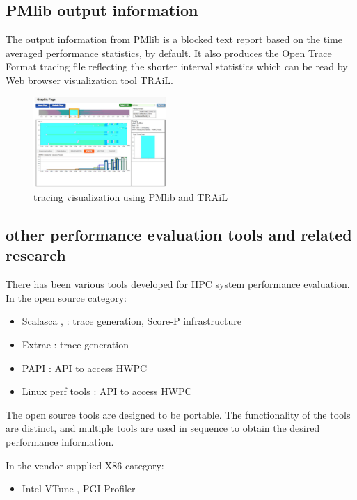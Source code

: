 \documentclass[conference]{IEEEtran}
\begin{document}
\subsection{PMlib output information}
\label{subsection:PMlib-output-information}

The output information from PMlib is a blocked text report based on
the time averaged performance statistics, by default.
It also produces the Open Trace Format tracing file reflecting
the shorter interval statistics which can be read by Web browser
visualization tool TRAiL.
\begin{figure}[tb]
\centering
\includegraphics[width=0.45\textwidth]{figs/TRAiL-small.pdf}
\caption{tracing visualization using PMlib and TRAiL}
\label{fig:TRAiL}
\end{figure}

\subsection{other performance evaluation tools and related research}
\label{subsection:related-research}
There has been various tools developed for HPC system  performance evaluation.
In the open source category:
\begin{itemize}
	\item Scalasca \cite{Scalasca:2017},\cite{Scalasca:2010}
			: trace generation, Score-P infrastructure
	\item Extrae \cite{Extrae:webpage} :  trace generation
	\item PAPI \cite{PAPI:5.6} : API to access HWPC
	\item Linux perf tools : API to access HWPC
\end{itemize}
The open source tools are designed to be portable. The functionality of the
tools are distinct, and multiple tools are used in sequence to obtain
the desired performance information.

In the vendor supplied X86 category:
\begin{itemize}
		\item Intel VTune \cite{Intel:VTune}, PGI Profiler \cite{PGI:Profiler}
\end{itemize}
\end{document}
